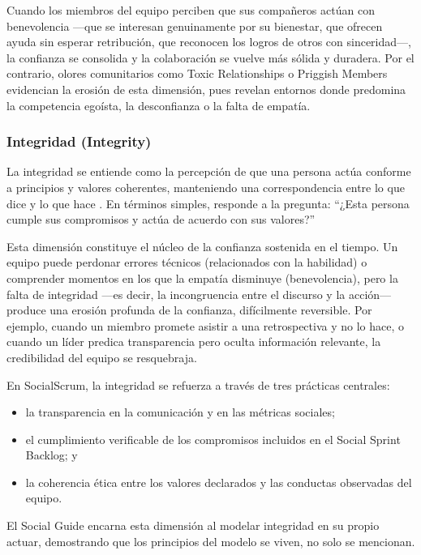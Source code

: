 Cuando los miembros del equipo perciben que sus compañeros actúan con benevolencia —que se interesan genuinamente por su bienestar, que ofrecen ayuda sin esperar retribución, que reconocen los logros de otros con sinceridad—, la confianza se consolida y la colaboración se vuelve más sólida y duradera.
Por el contrario, olores comunitarios como Toxic Relationships o Priggish Members evidencian la erosión de esta dimensión, pues revelan entornos donde predomina la competencia egoísta, la desconfianza o la falta de empatía.

\subsubsection{Integridad (Integrity)}

La integridad se entiende como la percepción de que una persona actúa conforme a principios y valores coherentes, manteniendo una correspondencia entre lo que dice y lo que hace \cite{mayer_integrative_1995}.
En términos simples, responde a la pregunta: ``¿Esta persona cumple sus compromisos y actúa de acuerdo con sus valores?''

Esta dimensión constituye el núcleo de la confianza sostenida en el tiempo.
Un equipo puede perdonar errores técnicos (relacionados con la habilidad) o comprender momentos en los que la empatía disminuye (benevolencia), pero la falta de integridad —es decir, la incongruencia entre el discurso y la acción— produce una erosión profunda de la confianza, difícilmente reversible.
Por ejemplo, cuando un miembro promete asistir a una retrospectiva y no lo hace, o cuando un líder predica transparencia pero oculta información relevante, la credibilidad del equipo se resquebraja.

En SocialScrum, la integridad se refuerza a través de tres prácticas centrales:

\begin{itemize}
    \item la transparencia en la comunicación y en las métricas sociales;
    \item el cumplimiento verificable de los compromisos incluidos en el Social Sprint Backlog; y
    \item la coherencia ética entre los valores declarados y las conductas observadas del equipo.
\end{itemize}

El Social Guide encarna esta dimensión al modelar integridad en su propio actuar, demostrando que los principios del modelo se viven, no solo se mencionan.

